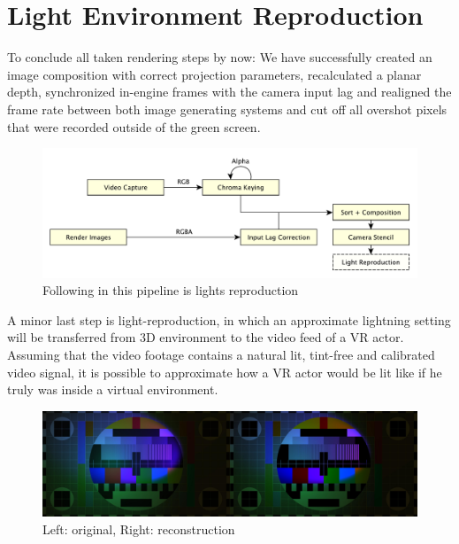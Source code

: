 %
\section{Light Environment Reproduction}

To conclude all taken rendering steps by now: We have successfully created an 
image composition with correct projection parameters, recalculated a planar 
depth, synchronized in-engine frames with the camera input lag and realigned 
the frame rate between both image generating systems and cut off all overshot 
pixels that were recorded outside of the green screen.

\begin{figure}[htb]
	\includegraphics[width=\textwidth]{_raw_resources/pipeline_steps/4_7_lights.pdf}
	\caption{Following in this pipeline is lights reproduction}
	\label{fig:steps:lights}
\end{figure}

A minor last step is light-reproduction, in which an approximate lightning 
setting will be transferred from 3D environment to the video feed of a VR 
actor. Assuming that the video footage contains a natural lit, tint-free and 
calibrated video signal, it is possible to approximate how a VR actor would 
be lit like if he truly was inside a virtual environment.

\begin{figure}[htb]
	\includegraphics[width=\textwidth]{_raw_resources/light-reconstruction/comparison.jpg}
	\caption{Left: original, Right: reconstruction}
	\label{fig:light-reconstruction:comparison}
\end{figure}

